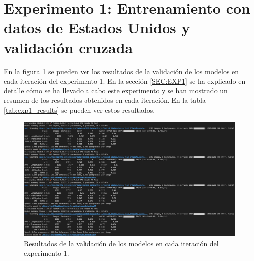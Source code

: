 
\section{Experimento 1: Entrenamiento con datos de Estados Unidos y validación cruzada}
En la figura \ref{fig:exp1_val_output} se pueden ver los resultados de la validación de los modelos en cada iteración del experimento 1. En la sección \ref{SEC:EXP1} se ha explicado en detalle cómo se ha llevado a cabo este experimento y se han mostrado un resumen de los resultados obtenidos en cada iteración. En la tabla \ref{tab:exp1_results} se pueden ver estos resultados.

\begin{figure}[H]
    \centering
    \includegraphics[width=\textwidth,height=\textheight,keepaspectratio]{../img/exp1-val-output.png}
    \caption{Resultados de la validación de los modelos en cada iteración del experimento 1.}
    \label{fig:exp1_val_output}
\end{figure}